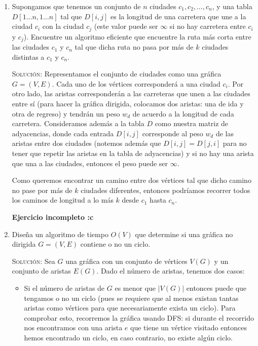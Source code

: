 \documentclass[letterpaper,11pt]{article}
\begin{document}
\begin{enumerate}
    \item Supongamos que tenemos un conjunto de $n$ ciudades $c_1, c_2, \ldots,
    c_n$, y una tabla $D[1 \ldots n, 1 \ldots n]$ tal que $D[i,j]$ es la longitud 
    de una carretera que une a la ciudad $c_i$ con la ciudad $c_j$ (este valor 
    puede ser $\infty$ si no hay carretera entre $c_i$ y $c_j$). Encuentre un 
    algoritmo eficiente que encuentre la ruta más corta entre las ciudades $c_1$
    y $c_n$ tal que dicha ruta no pasa por más de $k$ ciudades distintas a 
    $c_1$ y $c_n$.

    \textsc{Solución:} Representamos el conjunto de ciudades como una gráfica
    $G = (V, E)$. Cada uno de los vértices corresponderá a una ciudad $c_i$. 
    Por otro lado, las aristas corresponderán a las carreteras que unen a las 
    ciudades entre sí (para hacer la gráfica dirigida, colocamos dos aristas: 
    una de ida y otra de regreso) y tendrán un peso $w_d$ de acuerdo a la 
    longitud de cada carretera. Consideramos además a la tabla $D$ como 
    nuestra matriz de adyacencias, donde cada entrada $D[i,j]$ corresponde al 
    peso $w_d$ de las aristas entre dos ciudades (notemos además que $D[i,j] = 
    D[j, i]$ para no tener que repetir las aristas en la tabla de adyacencias)
    y si no hay una arista que una a las ciudades, entonces el peso puede ser 
    $\infty$.

    Como queremos encontrar un camino entre dos vértices tal que dicho camino 
    no pase por más de $k$ ciudades diferentes, entonces podríamos recorrer 
    todos los caminos de longitud a lo más $k$ desde $c_1$ hasta $c_n$. 

    \textbf{Ejercicio incompleto :c}

    \item Diseña un algoritmo de tiempo $O(V)$ que determine si una gráfica no
    dirigida $G = (V, E)$ contiene o no un ciclo.

    \textsc{Solución:} Sea $G$ una gráfica con un conjunto de vértices $V(G)$ y 
    un conjunto de aristas $E(G)$. Dado el número de aristas, tenemos dos casos:
    \begin{itemize}
        \item Si el número de aristas de $G$ es menor que $|V(G)|$ entonces puede 
        que tengamos o no un ciclo (pues se requiere que al menos existan tantas
        aristas como vértices para que necesariamente exista un ciclo). Para 
        comprobar esto, recorremos la gráfica usando DFS: si durante el recorrido
        nos encontramos con una arista $e$ que tiene un vértice visitado entonces
        hemos encontrado un ciclo, en caso contrario, no existe algún ciclo. 


\end{itemize}
\end{enumerate}
\end{document}
